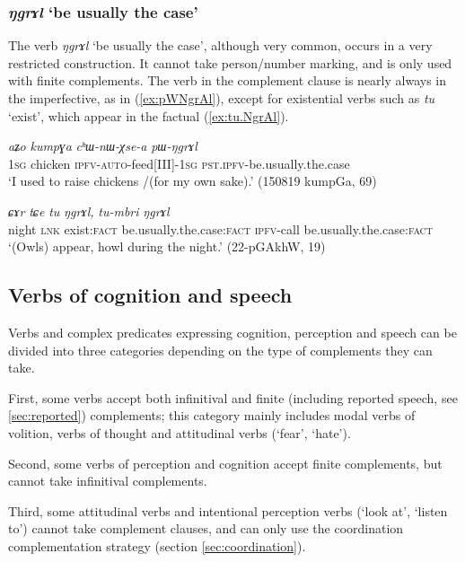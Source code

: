 \documentclass[oneside,a4paper,11pt]{article}
\newcommand{\ipa}[1]{\textit{\phon#1}}
\newcommand{\jpg}[2]{\ipa{#1} `#2'}
\newcommand{\refb}[1]{(\ref{#1})}
\begin{document}
\subsubsection{\jpg{ŋgrɤl}{be usually the case}}
The verb \jpg{ŋgrɤl}{be usually the case}, although very common, occurs in a very restricted construction. It cannot take person/number marking, and is only used with finite complements. The verb in the complement clause is nearly always in the imperfective, as in \refb{ex:pWNgrAl}, except for existential verbs such as \jpg{tu}{exist}, which appear in the factual (\ref{ex:tu.NgrAl}).

\begin{exe}
\ex \label{ex:pWNgrAl}
 \gll \ipa{aʑo} 	\ipa{kumpɣa} 	\ipa{cʰɯ-nɯ-χse-a} 	\ipa{pɯ-ŋgrɤl}  \\
\textsc{1sg}  chicken \textsc{ipfv-auto}-feed[III]-\textsc{1sg} \textsc{pst.ipfv}-be.usually.the.case \\
\glt `I used to raise chickens /(for my own sake).' (150819 kumpGa, 69)
\end{exe}
\begin{exe}
\ex \label{ex:tu.NgrAl}
 \gll
\ipa{ɕɤr} 	\ipa{tɕe} 	\ipa{tu} 	\ipa{ŋgrɤl,} 	\ipa{tu-mbri} 	\ipa{ŋgrɤl}  \\
night \textsc{lnk} exist:\textsc{fact} be.usually.the.case:\textsc{fact} \textsc{ipfv}-call be.usually.the.case:\textsc{fact} \\
\glt `(Owls) appear, howl during the night.' (22-pGAkhW, 19)
\end{exe}

\subsection{Verbs of cognition and speech} \label{sec:cognition}
Verbs and complex predicates expressing cognition, perception and speech can be divided into three categories depending on the type of complements they can take.

First, some verbs accept both infinitival and finite (including reported speech, see \ref{sec:reported}) complements; this category mainly includes modal verbs of volition, verbs of thought and attitudinal verbs (`fear', `hate').

Second, some verbs of perception and cognition accept finite complements, but cannot take infinitival complements.  

Third, some attitudinal verbs and intentional perception verbs (`look at', `listen to') cannot take complement clauses, and can only use the coordination complementation strategy (section  \ref{sec:coordination}).
 
\end{document}
